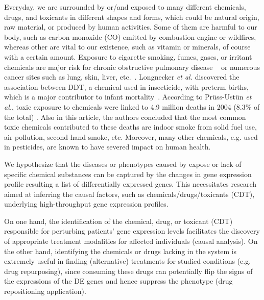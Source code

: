 Everyday, we are surrounded by or/and exposed to many different chemicals, drugs, and toxicants in different shapes and forms, which could be natural origin, raw material, or produced by human activities. Some of them are harmful to our body, such as  carbon monoxide (CO) emitted by combustion engine or wildfires, whereas other are vital to our existence, such as vitamin or minerals, of course with a certain amount. Exposure to cigarette smoking, fumes, gases, or irritant chemicals are major risk for chronic obstructive pulmonary disease ~\cite{boschetto2006chronic} or numerous cancer sites such as lung, skin, liver, etc.~\cite{clapp2008environmental}. Longnecker \textit{et al.} discovered the association between DDT, a chemical used in insecticide, with preterm births, which is a major contributor to infant mortality~\cite{longnecker2001association}.
According to Prüss-Ustün \textit{et al.}, toxic exposure to chemicals were linked to 4.9 million deaths in 2004 (8.3\% of the total) \cite{pruss2011knowns}. Also in this article, the authors concluded that the most common toxic chemicals contributed to these deaths are indoor smoke from solid fuel use, air pollution, second-hand smoke, etc. Moreover, many other chemicals, e.g. used in pesticides, are known to have severed impact on human health.

We hypothesize that the diseases or phenotypes caused by expose or lack of specific chemical substances can be captured by the changes in gene expression profile resulting a list of differentially expressed genes.
This necessitates research aimed at inferring the causal factors, such as chemicals/drugs/toxicants (CDT), underlying high-throughput gene expression profiles.

On one hand, the identification of the chemical, drug, or toxicant (CDT) responsible for perturbing patients' gene expression levels facilitates the discovery of appropriate treatment modalities for affected individuals (causal analysis).
On the other hand, identifying the chemicals or drugs lacking in the system is extremely useful in finding (alternative) treatments for studied conditions (e.g. drug repurposing), since consuming these drugs can potentially flip the signs of the expressions of the DE genes and hence suppress the phenotype (drug repositioning application).